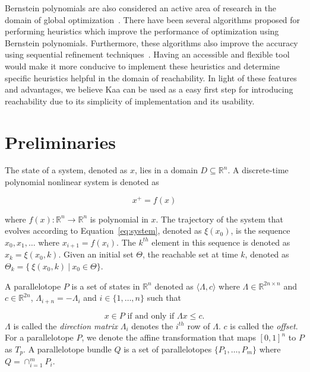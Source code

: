\documentclass[EPiC]{easychair}
\begin{document}
Bernstein polynomials are also considered an active area of research in the domain of global optimization~\cite{nataray2002algorithm,garloff2003bernstein,nataraj2007new}.
%
There have been several algorithms proposed for performing heuristics which improve the performance of optimization using Bernstein polynomials. Furthermore, these algorithms also improve the accuracy using sequential refinement techniques~\cite{smith2009fast,munoz2013formalization}.
%
Having an accessible and flexible tool would make it more conducive to implement these heuristics and determine specific heuristics helpful in the domain of reachability.
%
In light of these features and advantages, we believe Kaa can be used as a easy first step for introducing reachability due to its simplicity of implementation and its usability.

\section{Preliminaries}

The state of a system, denoted as $x$, lies in a domain $D \subseteq \mathbb{R}^n$. A discrete-time polynomial nonlinear system is denoted as

\begin{equation}
    x^{+} = f(x)
\label{eq:system}
\end{equation}

where $f(x) : \mathbb{R}^n \rightarrow \mathbb{R}^n$ is polynomial in $x$. 
%
The trajectory of the system that evolves according to Equation~\eqref{eq:system}, denoted as $\xi(x_0)$, is the sequence $x_0, x_1, \ldots$ where $x_{i+1} = f(x_i)$. 
%
The $k^{th}$ element in this sequence is denoted as $x_k = \xi(x_0,k)$.
%
Given an initial set $\Theta$, the reachable set at time $k$, denoted as $\Theta_{k} = \{~ \xi(x_0,k)~|~ x_0 \in \Theta\}$.

A parallelotope $P$ is a set of states in $\mathbb{R}^{n}$ denoted as $\langle \Lambda, c\rangle$ where $\Lambda \in \mathbb{R}^{2n \times n}$ and $c \in \mathbb{R}^{2n}$, $\Lambda_{i+n} = -\Lambda_{i}$ and $i \in \{1, \ldots, n\}$ such that

$$
x \in P \mbox{ if and only if } \Lambda x \leq c.
$$
$\Lambda$ is called the \emph{direction matrix} $\Lambda_i$ denotes the $i^{th}$ row of $\Lambda$. $c$ is called the \emph{offset}. For a parallelotope $P$, we denote the affine transformation that maps $[0,1]^{n}$ to $P$ as $T_{p}$. A parallelotope bundle $Q$ is a set of parallelotopes $\{P_1, \ldots, P_m\}$ where $Q = \cap_{i=1}^{m}P_i$.
\end{document}
